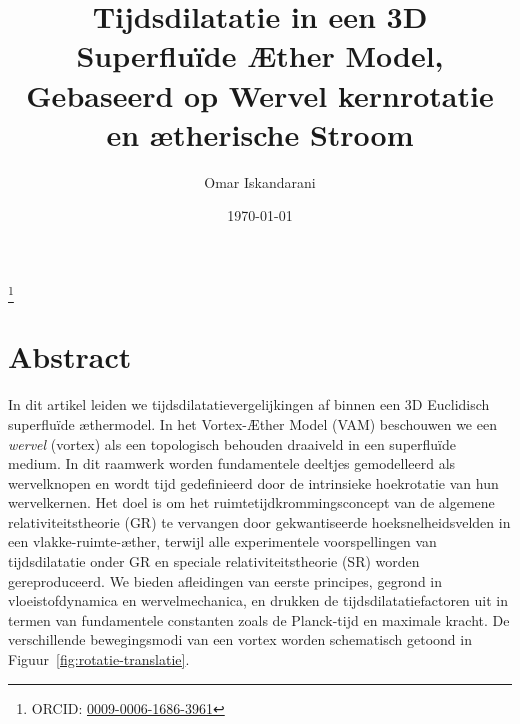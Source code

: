 \documentclass[a4paper,12pt]{revtex4}
\begin{document}
\author{Omar Iskandarani}
\title{Tijdsdilatatie in een 3D Superfluïde Æther Model, Gebaseerd op Wervel kernrotatie en ætherische Stroom}
\date{\today}
\thanks{ORCID: \href{https://orcid.org/0009-0006-1686-3961}{0009-0006-1686-3961}}

\maketitle

\section*{Abstract}
In dit artikel leiden we tijdsdilatatievergelijkingen af binnen een 3D Euclidisch superfluïde æthermodel. In het Vortex-Æther Model (VAM)
beschouwen we een \textit{wervel} (vortex) als een topologisch behouden draaiveld in een superfluïde medium. In dit raamwerk worden fundamentele deeltjes gemodelleerd als wervelknopen en wordt tijd gedefinieerd door de intrinsieke hoekrotatie van hun wervelkernen. Het doel is om het ruimtetijdkrommingsconcept van de algemene relativiteitstheorie (GR) te vervangen door gekwantiseerde hoeksnelheidsvelden in een vlakke-ruimte-æther, terwijl alle experimentele voorspellingen van tijdsdilatatie onder GR en speciale relativiteitstheorie (SR) worden gereproduceerd. We bieden afleidingen van eerste principes, gegrond in vloeistofdynamica en wervelmechanica, en drukken de tijdsdilatatiefactoren uit in termen van fundamentele constanten zoals de Planck-tijd en maximale kracht. De verschillende bewegingsmodi van een vortex worden schematisch getoond in Figuur~\ref{fig:rotatie-translatie}.
\end{document}
